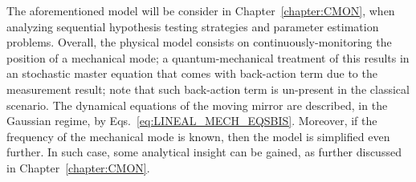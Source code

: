 The aforementioned model will be consider in Chapter~\ref{chapter:CMON}, when analyzing sequential hypothesis testing strategies and parameter estimation problems. Overall, the physical model consists on continuously-monitoring the position of a mechanical mode; a quantum-mechanical treatment of this results in an stochastic master equation that comes with back-action term due to the measurement result; note that such back-action term is un-present in the classical scenario. The dynamical equations of the moving mirror are described, in the Gaussian regime, by Eqs.~\ref{eq:LINEAL_MECH_EQSBIS}. Moreover, if the frequency of the mechanical mode is known, then the model is simplified even further. In such case, some analytical insight can be gained, as further discussed in Chapter~\ref{chapter:CMON}.
